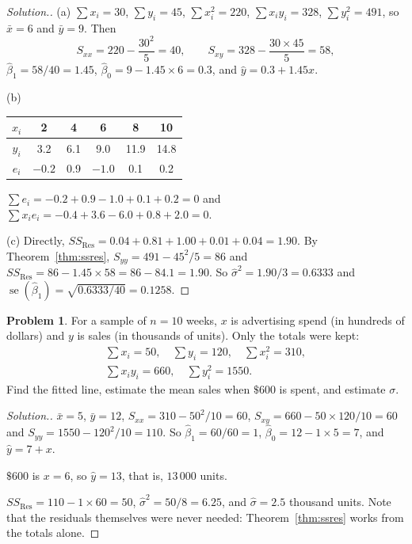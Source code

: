 \documentclass[11pt,a4paper]{article}
\numberwithin{equation}{section}
\theoremstyle{definition}
\newtheorem{problemx}{Problem}[subsection]
\newenvironment{problem}{\begin{problemx}}{\end{problemx}}
\newenvironment{solution}
  {\renewcommand{\qedsymbol}{}\begin{proof}[\textit{Solution}.]}
  {\end{proof}}
\begin{document}
\begin{solution}
(a) $\sum x_i = 30$, $\sum y_i = 45$, $\sum x_i^2 = 220$, $\sum x_i y_i = 328$, $\sum y_i^2 = 491$,
so $\bar x = 6$ and $\bar y = 9$. Then
\[
S_{xx} = 220 - \frac{30^2}{5} = 40, \qquad S_{xy} = 328 - \frac{30 \times 45}{5} = 58,
\]
$\hat\beta_1 = 58/40 = 1.45$, $\hat\beta_0 = 9 - 1.45 \times 6 = 0.3$, and $\hat y = 0.3 + 1.45x$.

(b)
\begin{center}
\begin{tabular}{c|ccccc}
$x_i$ & 2 & 4 & 6 & 8 & 10 \\
\hline
$\hat y_i$ & 3.2 & 6.1 & 9.0 & 11.9 & 14.8 \\
$e_i$ & $-0.2$ & 0.9 & $-1.0$ & 0.1 & 0.2 \\
\end{tabular}
\end{center}
$\sum e_i = -0.2 + 0.9 - 1.0 + 0.1 + 0.2 = 0$ and
$\sum x_i e_i = -0.4 + 3.6 - 6.0 + 0.8 + 2.0 = 0$.

(c) Directly, $SS_{\mathrm{Res}} = 0.04 + 0.81 + 1.00 + 0.01 + 0.04 = 1.90$. By
Theorem~\ref{thm:ssres}, $S_{yy} = 491 - 45^2/5 = 86$ and
$SS_{\mathrm{Res}} = 86 - 1.45 \times 58 = 86 - 84.1 = 1.90$. So
$\hat\sigma^2 = 1.90/3 = 0.6333$ and $\operatorname{se}(\hat\beta_1) = \sqrt{0.6333/40} = 0.1258$.
\end{solution}

\begin{problem}\label{prob:totals}
For a sample of $n = 10$ weeks, $x$ is advertising spend (in hundreds of dollars) and $y$ is
sales (in thousands of units). Only the totals were kept:
\begin{gather*}
\sum x_i = 50, \quad \sum y_i = 120, \quad \sum x_i^2 = 310, \\
\sum x_i y_i = 660, \quad \sum y_i^2 = 1550 .
\end{gather*}
Find the fitted line, estimate the mean sales when $\$600$ is spent, and estimate $\sigma.$
\end{problem}

\begin{solution}
$\bar x = 5$, $\bar y = 12$, $S_{xx} = 310 - 50^2/10 = 60$, $S_{xy} = 660 - 50 \times 120/10 = 60$
and $S_{yy} = 1550 - 120^2/10 = 110$. So $\hat\beta_1 = 60/60 = 1$, $\hat\beta_0 = 12 - 1 \times 5 = 7$,
and $\hat y = 7 + x$.

$\$600$ is $x = 6$, so $\hat y = 13$, that is, $13\,000$ units.

$SS_{\mathrm{Res}} = 110 - 1 \times 60 = 50$, $\hat\sigma^2 = 50/8 = 6.25$, and
$\hat\sigma = 2.5$ thousand units. Note that the residuals themselves were never needed:
Theorem~\ref{thm:ssres} works from the totals alone.
\end{solution}
\end{document}
